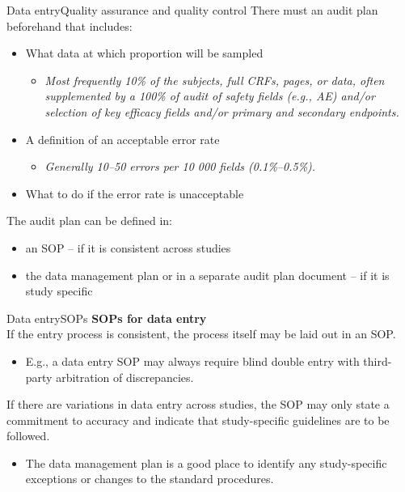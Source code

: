 \documentclass[xcolor=dvipsnames,11pt]{beamer}
\begin{document}
\begin{frame}[fragile]{Data entry}{Quality assurance and quality control}
	There must an audit plan beforehand that includes:
	\begin{itemize}
		\item What data at which proportion will be sampled
		\begin{itemize}
			\item[] \textit{Most frequently 10\% of the subjects, full CRFs, pages, or data, often supplemented by a 100\% of audit of safety fields (e.g., AE) and/or selection of key efficacy fields and/or primary and secondary endpoints.}
		\end{itemize}
		\item A definition of an acceptable error rate
		\begin{itemize}
			\item[] \textit{Generally 10--50 errors per 10 000 fields (0.1\%--0.5\%).}
		\end{itemize}
		\item What to do if the error rate is unacceptable
	\end{itemize}
	\bigskip
	The audit plan can be defined in:
	\begin{itemize}
		\item  an SOP -- if it is consistent across studies
		\item the data management plan or in a separate audit plan document -- if it is study specific
	\end{itemize}
\end{frame}

\begin{frame}[fragile]{Data entry}{SOPs}
	\textbf{SOPs for data entry}\\
	\bigskip
	If the entry process is \textcolor{PineGreen}{consistent}, the process itself may be laid out in an SOP.
	\begin{itemize}
		\item[] E.g., a data entry SOP may always require blind double entry with third-party arbitration of discrepancies.
	\end{itemize}
	\bigskip
	If there are \textcolor{PineGreen}{variations} in data entry across studies, the SOP may only state a commitment to accuracy and indicate that study-specific guidelines are to be followed.
	\begin{itemize}
		\item[] The data management plan is a good place to identify any study-specific exceptions or changes to the standard procedures.
	\end{itemize}
\end{frame}
\end{document}
